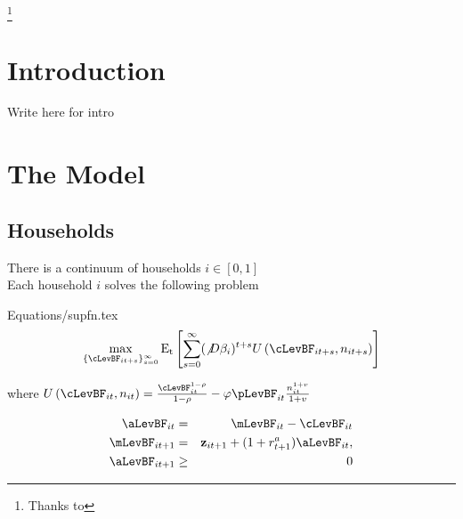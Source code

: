 \documentclass[titlepage]{\econtex}\providecommand{\texname}{BufferStockTheory}
\providecommand{\EqDir}{Equations}
\begin{document}
\begin{authorsinfo}
\end{authorsinfo}

\thanks{Thanks to }

\titlepagefinish


\newtheorem{defn}{Definition}
\newtheorem{theorem}{Theorem}

\hypertarget{Introduction}{}
\section{Introduction}

\label{sec:intro}


Write here for intro



\hypertarget{The-Model}{}
\section{The Model}

\subsection{Households}
\label{subsec:Households}
There is a continuum of households $ i \in [0,1]$ \\
Each household $i$ solves the following problem
\begin{verbatimwrite}{\EqDir/supfn.tex}
\begin{eqnarray}
  \label{eq:supfn}
  \max_{\{\cLevBF_{it+s}\}_{s=0}^{\infty}} \mathrm{E_{t}}\left[\sum_{s=0}^{\infty} (\not D \beta_{i})^{t+s} U\left(  \cLevBF_{i t+s}, n_{i t+s}\right)\right]
\end{eqnarray}
\end{verbatimwrite}

where
$U\left(\cLevBF_{i t}, n_{i t}\right) = \frac{\cLevBF_{i t}^{1-\rho}}{1 -\rho} - \varphi \pLevBF_{it} \frac{n_{it}^{1+v}}{1+v}$  




\begin{eqnarray}
\aLevBF_{it}     &=& \mLevBF_{it} - \cLevBF_{it}   \label{eq:DBCparts} \\
\mLevBF_{it+1} &=& \mathbf{z}_{it+1} +   (1 + r^{a}_{t+1} ) \aLevBF_{it}  , \\
\aLevBF_{it+1}  &\geq&  0 \\
\end{eqnarray}
\end{document}
